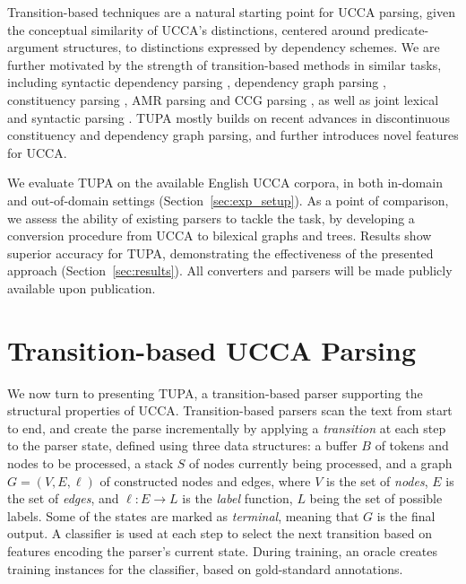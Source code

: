 \documentclass[11pt,a4paper]{article}
\newcommand{\parser}[1]{TUPA\textsubscript{#1}}
\newcommand{\secref}[1]{Section~\ref{#1}}
\begin{document}
Transition-based techniques are a natural
starting point for UCCA parsing, given the conceptual similarity of UCCA's distinctions,
centered around predicate-argument structures, to distinctions expressed by dependency schemes.
We are further motivated by the strength of transition-based methods
in similar tasks, including syntactic dependency parsing
\cite{dyer2015transition,andor2016globally,kiperwasser2016simple},
dependency graph parsing
\cite{sagae2008shift,ribeyre-villemontedelaclergerie-seddah:2014:SemEval,tokgoz2015transition},
constituency parsing \cite{sagae2005classifier,zhang2009transition,zhu2013fast,maier2015discontinuous,maier-lichte:2016:DiscoNLP},
AMR parsing \cite{wang-xue-pradhan:2015:ACL-IJCNLP,wang2015transition,wang-EtAl:2016:SemEval,dipendra2016neural,goodman2016noise,zhou2016amr,damonte2016incremental}
and CCG parsing \cite{ambati2015incremental,ambati-deoskar-steedman:2016:N16-1},
as well as joint lexical and syntactic parsing
\cite{constant-nivre:2016:P16-1}.
\parser{} mostly builds on recent advances in discontinuous constituency
and dependency graph parsing, and further introduces novel features for UCCA.

We evaluate \parser{} on the available English UCCA corpora, in both
in-domain and out-of-domain settings (\secref{sec:exp_setup}).
As a point of comparison, we assess the ability of existing
parsers to tackle the task, by developing a conversion procedure
from UCCA to bilexical graphs and trees.
Results show superior accuracy for \parser{}, demonstrating the effectiveness of
the presented approach (\secref{sec:results}).
All converters and parsers will be made publicly available upon publication.


\section{Transition-based UCCA Parsing}\label{sec:direct_approach}

We now turn to presenting \parser{},
a transition-based parser supporting the structural properties of UCCA.
Transition-based parsers \cite{Nivre03anefficient} scan the text from start to end,
and create the parse incrementally by applying a \textit{transition}
at each step to the parser state,
defined using three data structures: a buffer $B$ of tokens and nodes to be processed,
a stack $S$ of nodes currently being processed,
and a graph $G=(V,E,\ell)$ of constructed nodes and edges,
where $V$ is the set of \emph{nodes}, $E$ is the set of \emph{edges},
and $\ell : E \to L$ is the \emph{label} function, $L$ being the set of possible labels.
Some of the states are marked as \textit{terminal}, meaning that $G$ is the final output.
A classifier is used at each step to select the next transition based on features
encoding the parser's current state.
During training, an oracle creates training instances for the classifier,
based on gold-standard annotations.
\end{document}
